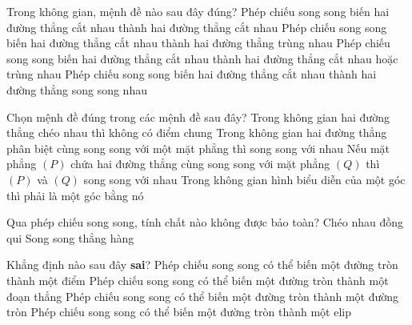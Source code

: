 \begin{ex}%
	 Trong không gian, mệnh đề nào sau đây đúng?
	 \choice
		{Phép chiếu song song biến hai đường thẳng cắt nhau thành hai đường  thẳng cắt nhau}
		{Phép chiếu song song biến hai đường thẳng  cắt nhau thành hai đường thẳng trùng nhau}
		{\True Phép chiếu song song biến hai đường thẳng cắt nhau thành hai đường  thẳng cắt nhau hoặc trùng nhau}
		{Phép chiếu song song biến  hai đường thẳng cắt nhau thành hai đường thẳng song song nhau}
\end{ex}

\begin{ex}%
	Chọn mệnh đề  đúng trong các mệnh đề sau đây?
	 \choice
		{\True Trong  không gian hai đường thẳng chéo nhau thì không có điểm chung}
		{Trong không gian hai đường thẳng phân biệt cùng song song với một mặt phẳng  thì song song với nhau}
		{Nếu mặt phẳng $(P)$ chứa hai đường thẳng cùng song song với mặt phẳng $(Q)$ thì $(P)$ và $(Q)$ song song với nhau} 
		{Trong không  gian hình biểu diễn của một góc thì phải là một góc bằng nó}
\end{ex}

\begin{ex}%
	Qua phép chiếu song song, tính chất nào không  được bảo toàn?
	 \choice
		 {\True Chéo nhau}
		{đồng  qui}
		 {Song song}
		 {thẳng hàng}
\end{ex}

\begin{ex}%
	Khẳng định  nào sau đây \textbf{sai}?
	 \choice
		{\True Phép chiếu song song có thể biến một đường tròn thành một điểm} 
		{Phép chiếu song song có thể biến  một đường tròn thành một đoạn thẳng}
		{Phép chiếu song song có thể biến một  đường tròn thành một đường tròn}
		{Phép chiếu song song có thể biến một đường tròn thành  một elip}
\end{ex}

